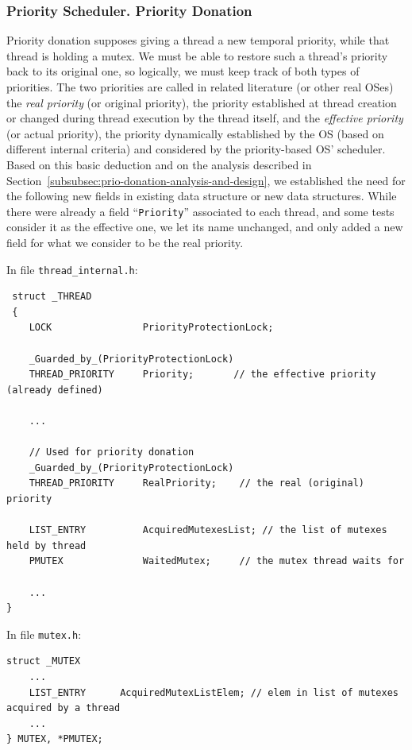 \subsubsection{Priority Scheduler. Priority Donation}
\label{subsubsec:prio-donation-data-structures}

Priority donation supposes giving a thread a new temporal priority, while that thread is holding a mutex. We must be able to restore such a thread's priority back to its original one, so logically, we must keep track of both types of priorities. The two priorities are called in related literature (or other real OSes) the \textit{real priority} (or original priority), the priority established at thread creation or changed during thread execution by the thread itself, and the \textit{effective priority} (or actual priority), the priority dynamically established by the OS (based on different internal criteria) and considered by the priority-based OS' scheduler. Based on this basic deduction and on the analysis described in Section~\ref{subsubsec:prio-donation-analysis-and-design}, we established the need for the following new fields in existing data structure or new data structures. While there were already a field ``\lstinline|Priority|'' associated to each thread, and some tests consider it as the effective one, we let its name unchanged, and only added a new field for what we consider to be the real priority.

In file \lstinline|thread_internal.h|:

\begin{lstlisting}
 struct _THREAD
 {
    LOCK                PriorityProtectionLock;
 
    _Guarded_by_(PriorityProtectionLock)
    THREAD_PRIORITY     Priority;       // the effective priority (already defined)

    ...
    
    // Used for priority donation
    _Guarded_by_(PriorityProtectionLock)
    THREAD_PRIORITY     RealPriority;    // the real (original) priority
    
    LIST_ENTRY          AcquiredMutexesList; // the list of mutexes held by thread
    PMUTEX              WaitedMutex;     // the mutex thread waits for
    
    ...
}
\end{lstlisting}

In file \lstinline|mutex.h|:

\begin{lstlisting}
struct _MUTEX
    ...
    LIST_ENTRY      AcquiredMutexListElem; // elem in list of mutexes acquired by a thread
    ...
} MUTEX, *PMUTEX;
\end{lstlisting}

